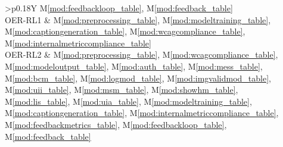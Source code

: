 \documentclass[12pt, titlepage]{article}
\newcommand{\mref}[1]{M\ref{#1}}
\begin{document}
\begin{table}[H]
\begin{tabularx}{\textwidth}{>{\RaggedRight\arraybackslash}p{}Y}
    \mref{mod:feedbackloop_table}, \mref{mod:feedback_table}\\
    OER-RL1 & \mref{mod:preprocessing_table},
    \mref{mod:modeltraining_table},
    \mref{mod:captiongeneration_table},
    \mref{mod:wcagcompliance_table}, \mref{mod:internalmetriccompliance_table}\\
    OER-RL2 & \mref{mod:preprocessing_table},
    \mref{mod:wcagcompliance_table}, \mref{mod:modeloutput_table},
    \mref{mod:auth_table}, \mref{mod:mess_table},
    \mref{mod:bcm_table}, \mref{mod:logmod_table},
    \mref{mod:imgvalidmod_table}, \mref{mod:uii_table},
    \mref{mod:msm_table},  \mref{mod:showhm_table},
    \mref{mod:lis_table}, \mref{mod:uia_table}, \mref{mod:modeltraining_table},
    \mref{mod:captiongeneration_table},
    \mref{mod:internalmetriccompliance_table}, \mref{mod:feedbackmetrics_table},
    \mref{mod:feedbackloop_table}, \mref{mod:feedback_table}\\
    \bottomrule
  \end{tabularx}
\end{table}
\end{document}
